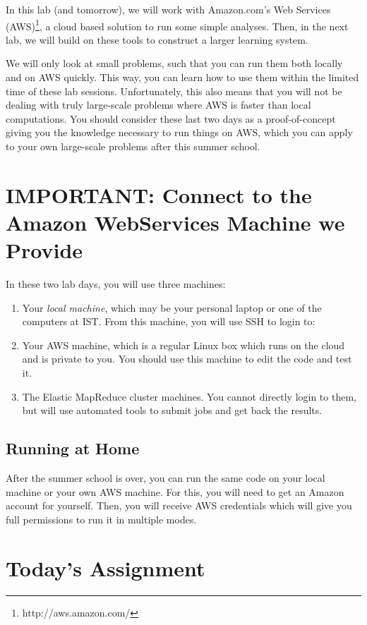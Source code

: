 In this lab (and tomorrow), we will work with Amazon.com's Web Services
(AWS)\footnote{http://aws.amazon.com/}, a cloud based solution to run some
simple analyses. Then, in the next lab, we will build on these
tools to construct a larger learning system.

We will only look at small problems, such that you can run them both locally and on AWS quickly. This way, you can learn how to use them within the limited time of these lab sessions. Unfortunately, this also means that you will not be dealing with truly large-scale problems where AWS is faster than local computations. You should consider these last two days as a proof-of-concept giving you the knowledge necessary to run things on AWS, which you can apply to your own large-scale problems after this summer school.

\section*{IMPORTANT: Connect to the Amazon WebServices Machine we Provide}

In these two lab days, you will use three machines:

\begin{enumerate}
\item Your \emph{local machine}, which may be your personal laptop or one of
the computers at IST. From this machine, you will use SSH to login to:
\item Your AWS machine, which is a regular Linux box which runs on the cloud
and is private to you. You should use this machine to edit the code and test
it.
\item The Elastic MapReduce cluster machines. You cannot directly login to
them, but will use automated tools to submit jobs and get back the results.
\end{enumerate}

\subsection*{Running at Home}

After the summer school is over, you can run the same code on your local
machine or your own AWS machine. For this, you will need to get an Amazon
account for yourself. Then, you will receive AWS credentials which will give
you full permissions to run it in multiple modes.

\section*{Today's Assignment}

